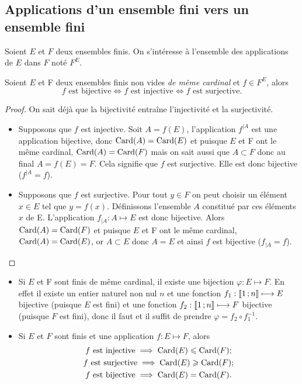 \subsection{Applications d'un ensemble fini vers un ensemble fini}
Soient \(E\) et \(F\) deux ensembles finis. On s'intéresse à l'ensemble des applications de \(E\) dans \(F\) noté \(F^E\).
\begin{theo}\label{theo:bijinjsurj}
  Soient \(E\) et F deux ensembles finis non vides \emph{de même cardinal} et \(f\in F^E\), alors
  \begin{equation}
    f \text{~est bijective}\iff f \text{~est injective}\iff f \text{~est surjective}.
  \end{equation}
\end{theo}
\begin{proof}
  On sait déjà que la bijectivité entraîne l'injectivité et la surjectivité.
  \begin{itemize}
  \item Supposons que \(f\) est injective. Soit \(A=f(E)\), l'application \(f^{|A}\) est une application bijective, donc \(\operatorname{Card}(A)=\operatorname{Card}(E)\) et puisque \(E\) et F ont le même cardinal, \(\operatorname{Card}(A)=\operatorname{Card}(F)\) mais on sait aussi que \(A\subset F\) donc au final \(A=f(E)=F\). Cela signifie que \(f\) est surjective. Elle est donc bijective (\(f^{|A}=f\)).
  \item Supposons que \(f\) est surjective. Pour tout \(y\in F\) on peut choisir un élément \(x\in E\) tel que \(y=f(x)\). Définissons l'ensemble \(A\) constitué par ces éléments \(x\) de E. L'application \(f_{|A}:A\longmapsto E\) est donc bijective. Alors \(\operatorname{Card}(A)=\operatorname{Card}(F)\) et puisque \(E\) et F ont le même cardinal, \(\operatorname{Card}(A)=\operatorname{Card}(E)\), or \(A\subset E\) donc \(A=E\) et ainsi \(f\) est bijective (\(f_{|A}=f\)).
  \end{itemize}
\end{proof}
\begin{itemize}
\item Si \(E\) et F sont finis de même cardinal, il existe une bijection \(\varphi:E\longmapsto F\). En effet il existe un entier naturel non nul \(n\) et une fonction \(f_1:\mathopen{\llbracket}1\mathclose{}\mathpunct{};n\mathclose{\rrbracket} \longmapsto E\) bijective (puisque \(E\) est fini) et une fonction \(f_2:\mathopen{\llbracket}1\mathclose{}\mathpunct{};n\mathclose{\rrbracket} \longmapsto F\) bijective (puisque \(F\) est fini), donc il faut et il suffit de prendre \(\varphi=f_2\circ f_1^{-1}\).
\item Si \(E\) et \(F\) sont finis et une application \(f:E\longmapsto F\), alors
  \begin{gather}
    f \text{~est injective} \implies \operatorname{Card}(E)\leqslant\operatorname{Card}(F); \\
    f \text{~est surjective}\implies \operatorname{Card}(E)\geqslant\operatorname{Card}(F);\\
    f \text{~est bijective} \implies \operatorname{Card}(E)=\operatorname{Card}(F). 
  \end{gather}
\end{itemize}
